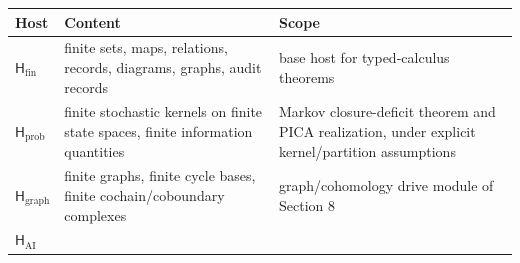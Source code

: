 \documentclass[11pt]{article}
\theoremstyle{definition}
\begin{document}
\begin{longtable}[]{@{}lll@{}}
\toprule
\begin{minipage}[b]{0.30\columnwidth}\raggedright
Host\strut
\end{minipage} & \begin{minipage}[b]{0.30\columnwidth}\raggedright
Content\strut
\end{minipage} & \begin{minipage}[b]{0.30\columnwidth}\raggedright
Scope\strut
\end{minipage}\tabularnewline
\midrule
\endhead
\begin{minipage}[t]{0.30\columnwidth}\raggedright
\(\mathsf H_{\mathrm{fin}}\)\strut
\end{minipage} & \begin{minipage}[t]{0.30\columnwidth}\raggedright
finite sets, maps, relations, records, diagrams, graphs, audit records\strut
\end{minipage} & \begin{minipage}[t]{0.30\columnwidth}\raggedright
base host for typed-calculus theorems\strut
\end{minipage}\tabularnewline
\begin{minipage}[t]{0.30\columnwidth}\raggedright
\(\mathsf H_{\mathrm{prob}}\)\strut
\end{minipage} & \begin{minipage}[t]{0.30\columnwidth}\raggedright
finite stochastic kernels on finite state spaces, finite information quantities\strut
\end{minipage} & \begin{minipage}[t]{0.30\columnwidth}\raggedright
Markov closure-deficit theorem and PICA realization, under explicit kernel/partition assumptions\strut
\end{minipage}\tabularnewline
\begin{minipage}[t]{0.30\columnwidth}\raggedright
\(\mathsf H_{\mathrm{graph}}\)\strut
\end{minipage} & \begin{minipage}[t]{0.30\columnwidth}\raggedright
finite graphs, finite cycle bases, finite cochain/coboundary complexes\strut
\end{minipage} & \begin{minipage}[t]{0.30\columnwidth}\raggedright
graph/cohomology drive module of Section 8\strut
\end{minipage}\tabularnewline
\begin{minipage}[t]{0.30\columnwidth}\raggedright
\(\mathsf H_{\mathrm{AI}}\)\strut

\end{minipage}
\end{longtable}
\end{document}
